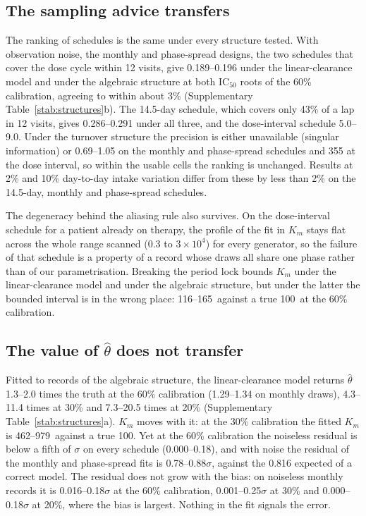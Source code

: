 \subsection{The sampling advice transfers}
\label{si:s3:design}

The ranking of schedules is the same under every structure tested. With observation noise, the
monthly and phase-spread designs, the two schedules that cover the dose cycle within 12 visits,
give 0.189--0.196 under the linear-clearance model and under the algebraic structure at both
$\mathrm{IC}_{50}$ roots of the 60\% calibration, agreeing to within about 3\% (Supplementary Table~\ref{stab:structures}b). The
14.5-day schedule, which covers only 43\% of a lap in 12 visits, gives 0.286--0.291 under all
three, and the dose-interval schedule 5.0--9.0. Under the turnover structure the precision is
either unavailable (singular information) or 0.69--1.05 on the monthly and phase-spread schedules
and 355 at the dose interval, so within the usable cells the ranking is unchanged. Results at 2\%
and 10\% day-to-day intake variation differ from these by less than 2\% on the 14.5-day, monthly
and phase-spread schedules.

The degeneracy behind the aliasing rule also survives. On the dose-interval schedule for a patient
already on therapy, the profile of the fit in $K_m$ stays flat across the whole range scanned
(0.3 to $3\times10^4$\uM) for every generator, so the failure of that schedule is a property of a
record whose draws all share one phase rather than of our parametrisation. Breaking the period
lock bounds $K_m$ under the linear-clearance model and under the algebraic structure, but under
the latter the bounded interval is in the wrong place: 116--165\uM\ against a true 100\uM\ at
the 60\% calibration.

\subsection{The value of \texorpdfstring{$\hat\theta$}{theta} does not transfer}
\label{si:s3:value}

Fitted to records of the algebraic structure, the linear-clearance model returns $\hat\theta$
1.3--2.0 times the truth at the 60\% calibration (1.29--1.34 on monthly draws), 4.3--11.4 times
at 30\% and 7.3--20.5 times at 20\% (Supplementary Table~\ref{stab:structures}a). $K_m$ moves
with it: at the 30\% calibration the fitted $K_m$ is 462--979\uM\ against a true 100\uM. Yet at
the 60\% calibration the noiseless residual is below a fifth of $\sigma$ on every schedule
(0.000--0.18), and with noise the residual of the monthly and phase-spread fits is
0.78--0.88$\sigma$, against the 0.816 expected of a correct model. The residual does not grow with
the bias: on noiseless monthly records it is 0.016--0.18$\sigma$ at the 60\% calibration,
0.001--0.25$\sigma$ at 30\% and 0.000--0.18$\sigma$ at 20\%, where the bias is largest. Nothing in
the fit signals the error.

